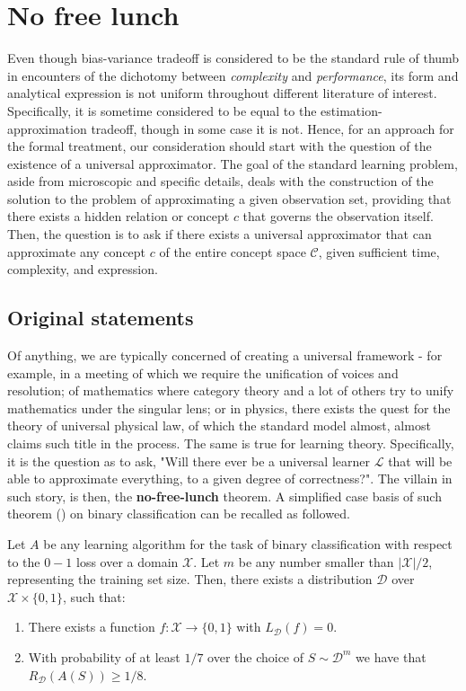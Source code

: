 \chapter{No free lunch}

Even though bias-variance tradeoff is considered to be the standard rule of thumb in encounters of the dichotomy between \textit{complexity} and \textit{performance}, its form and analytical expression is not uniform throughout different literature of interest. Specifically, it is sometime considered to be equal to the estimation-approximation tradeoff, though in some case it is not. Hence, for an approach for the formal treatment, our consideration should start with the question of the existence of a universal approximator. The goal of the standard learning problem, aside from microscopic and specific details, deals with the construction of the solution to the problem of approximating a given observation set, providing that there exists a hidden relation or concept $c$ that governs the observation itself. Then, the question is to ask if there exists a universal approximator that can approximate any concept $c$ of the entire concept space $\mathcal{C}$, given sufficient time, complexity, and expression. 

\section{Original statements}

Of anything, we are typically concerned of creating a universal framework - for example, in a meeting of which we require the unification of voices and resolution; of mathematics where category theory and a lot of others try to unify mathematics under the singular lens; or in physics, there exists the quest for the theory of universal physical law, of which the standard model almost, almost claims such title in the process. The same is true for learning theory. Specifically, it is the question as to ask, "Will there ever be a universal learner $\mathcal{L}$ that will be able to approximate everything, to a given degree of correctness?". The villain in such story, is then, the \textbf{no-free-lunch} theorem. A simplified case basis of such theorem (\cite{10.5555/2621980}) on binary classification can be recalled as followed. 

\begin{theorem}
    Let $A$ be any learning algorithm for the task of binary classification with respect to the $0-1$ loss over a domain $\mathcal{X}$. Let $m$ be any number smaller than $|\mathcal{X}|/2$, representing the training set size. Then, there exists a distribution $\mathcal{D}$ over $\mathcal{X}\times \{0,1\}$, such that: 
    \begin{enumerate}
        \item There exists a function $f:\mathcal{X}\to \{0,1\}$ with $L_{\mathcal{D}}(f)= 0$. 
        \item With probability of at least $1/7$ over the choice of $S\sim \mathcal{D}^{m}$ we have that $R_{\mathcal{D}}(A(S))\geq 1/8$. 
    \end{enumerate}
\end{theorem}

